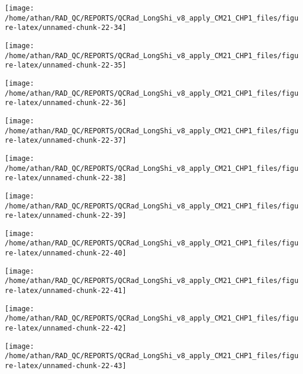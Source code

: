 \documentclass[
  10pt,
  a4paper,oneside]{article}
\begin{document}
\begin{center}\texttt{[image: /home/athan/RAD\_QC/REPORTS/QCRad\_LongShi\_v8\_apply\_CM21\_CHP1\_files/figure-latex/unnamed-chunk-22-34]} \end{center}

\begin{center}\texttt{[image: /home/athan/RAD\_QC/REPORTS/QCRad\_LongShi\_v8\_apply\_CM21\_CHP1\_files/figure-latex/unnamed-chunk-22-35]} \end{center}

\begin{center}\texttt{[image: /home/athan/RAD\_QC/REPORTS/QCRad\_LongShi\_v8\_apply\_CM21\_CHP1\_files/figure-latex/unnamed-chunk-22-36]} \end{center}

\begin{center}\texttt{[image: /home/athan/RAD\_QC/REPORTS/QCRad\_LongShi\_v8\_apply\_CM21\_CHP1\_files/figure-latex/unnamed-chunk-22-37]} \end{center}

\begin{center}\texttt{[image: /home/athan/RAD\_QC/REPORTS/QCRad\_LongShi\_v8\_apply\_CM21\_CHP1\_files/figure-latex/unnamed-chunk-22-38]} \end{center}

\begin{center}\texttt{[image: /home/athan/RAD\_QC/REPORTS/QCRad\_LongShi\_v8\_apply\_CM21\_CHP1\_files/figure-latex/unnamed-chunk-22-39]} \end{center}

\begin{center}\texttt{[image: /home/athan/RAD\_QC/REPORTS/QCRad\_LongShi\_v8\_apply\_CM21\_CHP1\_files/figure-latex/unnamed-chunk-22-40]} \end{center}

\begin{center}\texttt{[image: /home/athan/RAD\_QC/REPORTS/QCRad\_LongShi\_v8\_apply\_CM21\_CHP1\_files/figure-latex/unnamed-chunk-22-41]} \end{center}

\begin{center}\texttt{[image: /home/athan/RAD\_QC/REPORTS/QCRad\_LongShi\_v8\_apply\_CM21\_CHP1\_files/figure-latex/unnamed-chunk-22-42]} \end{center}

\begin{center}\texttt{[image: /home/athan/RAD\_QC/REPORTS/QCRad\_LongShi\_v8\_apply\_CM21\_CHP1\_files/figure-latex/unnamed-chunk-22-43]} \end{center}
\end{document}
